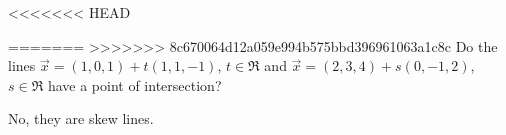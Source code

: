 
\begin{Exercise}[
name={},
title={}, 
difficulty=0,
origin={\cite{SM}}]
<<<<<<< HEAD

=======
>>>>>>> 8c670064d12a059e994b575bbd396961063a1c8c
Do the lines $\vec{x} = (1,0,1) + t(1,1,-1)$, $t\in\Re$ and $\vec{x}=(2,3,4)+s(0,-1,2)$, $s\in\Re$ have a point of intersection?

\end{Exercise}

\begin{Answer}
No, they are skew lines.
\end{Answer}
